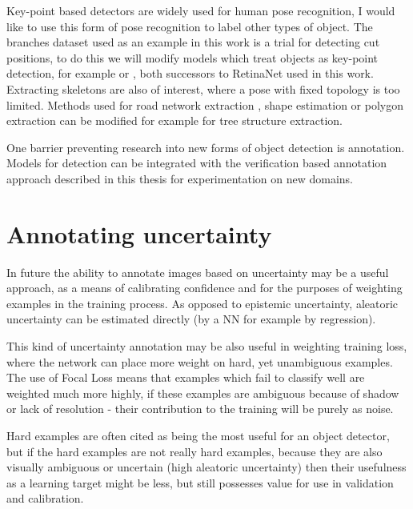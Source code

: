 Key-point based detectors are widely used for human pose recognition, I would like to use this form of pose recognition to label other types of object. The branches dataset used as an example in this work is a trial for detecting cut positions, to do this we will modify models which treat objects as key-point detection, for example \cite{Zhou2019} or \cite{Law2018}, both successors to RetinaNet \cite{Wang2017} used in this work. Extracting skeletons are also of interest, where a pose with fixed topology is too limited. Methods used for road network extraction \cite{Li2018}, shape estimation \cite{Jiang2019a} or polygon extraction \cite{Acuna2018} can be modified for example for tree structure extraction. 

One barrier preventing research into new forms of object detection is annotation. Models for detection can be integrated with the verification based annotation approach described in this thesis for experimentation on new domains.

\section{Annotating uncertainty}

In future the ability to annotate images based on uncertainty may be a useful approach, as a means of calibrating confidence and for the purposes of weighting examples in the training process. As opposed to epistemic uncertainty, aleatoric uncertainty can be estimated directly (by a \gls{NN} for example by regression).  

This kind of uncertainty annotation may be also useful in weighting training loss, where the network can place more weight on hard, yet unambiguous examples. The use of Focal Loss means that examples which fail to classify well are weighted much more highly, if these examples are ambiguous because of shadow or lack of resolution - their contribution to the training will be purely as noise.

Hard examples are often cited as being the most useful for an object detector, but if the hard examples are not really hard examples, because they are also visually ambiguous or uncertain (high aleatoric uncertainty) then their usefulness as a learning target might be less, but still possesses value for use in validation and calibration.